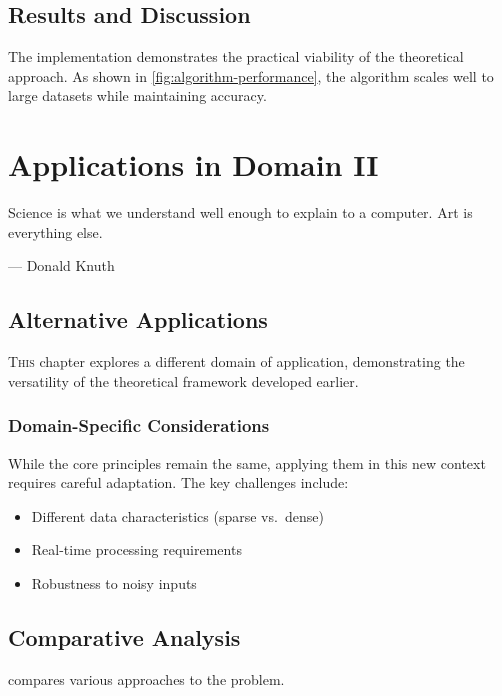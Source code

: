 \documentclass[11pt,twoside,openright]{book}
\theoremstyle{plain}
\theoremstyle{definition}
\theoremstyle{remark}
\begin{document}
\section{Results and Discussion}
\label{sec:app1-results}

The implementation demonstrates the practical viability of the theoretical approach. As shown in \cref{fig:algorithm-performance}, the algorithm scales well to large datasets while maintaining accuracy.

\chapter{Applications in Domain II}
\label{ch:applications2}

\epigraph{Science is what we understand well enough to explain to a computer. Art is everything else.}{--- Donald Knuth}

\section{Alternative Applications}
\label{sec:app2-intro}

\lettrine{T}{his} chapter explores a different domain of application, demonstrating the versatility of the theoretical framework developed earlier.

\subsection{Domain-Specific Considerations}

While the core principles remain the same, applying them in this new context requires careful adaptation. The key challenges include:

\begin{itemize}[itemsep=0.3em]
    \item Different data characteristics (sparse vs.\ dense)
    \item Real-time processing requirements
    \item Robustness to noisy inputs
\end{itemize}

\section{Comparative Analysis}
\label{sec:app2-comparison}

 compares various approaches to the problem.
\end{document}
